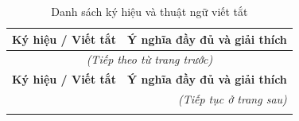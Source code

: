 \documentclass[12pt,a4paper]{report}
\begin{document}
\renewcommand{\arraystretch}{1.18} %
\begin{longtable}{|p{}|p{}|} %
\caption{Danh sách ký hiệu và thuật ngữ viết tắt}\label{tab:symbols}\\
\hline
\textbf{Ký hiệu / Viết tắt} & \textbf{Ý nghĩa đầy đủ và giải thích} \\
\hline
\endfirsthead

\multicolumn{2}{c}{\textit{(Tiếp theo từ trang trước)}} \\ 
\hline
\textbf{Ký hiệu / Viết tắt} & \textbf{Ý nghĩa đầy đủ và giải thích} \\
\hline
\endhead

\hline
\multicolumn{2}{r}{\textit{(Tiếp tục ở trang sau)}} \\
\hline
\endfoot

\hline
\endlastfoot


\end{longtable}
\end{document}
